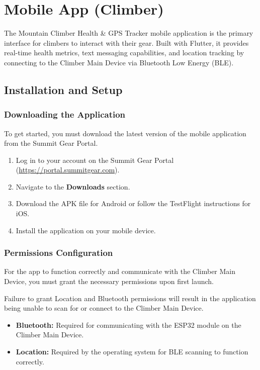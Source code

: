 \chapter{Mobile App (Climber)}
\label{ch:mobile-app}

The Mountain Climber Health \& GPS Tracker mobile application is the primary interface for climbers to interact with their gear. Built with Flutter, it provides real-time health metrics, text messaging capabilities, and location tracking by connecting to the Climber Main Device via Bluetooth Low Energy (BLE).

\section{Installation and Setup}

\subsection{Downloading the Application}
To get started, you must download the latest version of the mobile application from the Summit Gear Portal.

\begin{enumerate}
    \item Log in to your account on the Summit Gear Portal (\url{https://portal.summitgear.com}).
    \item Navigate to the \textbf{Downloads} section.
    \item Download the APK file for Android or follow the TestFlight instructions for iOS.
    \item Install the application on your mobile device.
\end{enumerate}

\subsection{Permissions Configuration}
For the app to function correctly and communicate with the Climber Main Device, you must grant the necessary permissions upon first launch.

\begin{warningbox}
Failure to grant Location and Bluetooth permissions will result in the application being unable to scan for or connect to the Climber Main Device.
\end{warningbox}

\begin{itemize}
    \item \textbf{Bluetooth:} Required for communicating with the ESP32 module on the Climber Main Device.
    \item \textbf{Location:} Required by the operating system for BLE scanning to function correctly.
\end{itemize}

